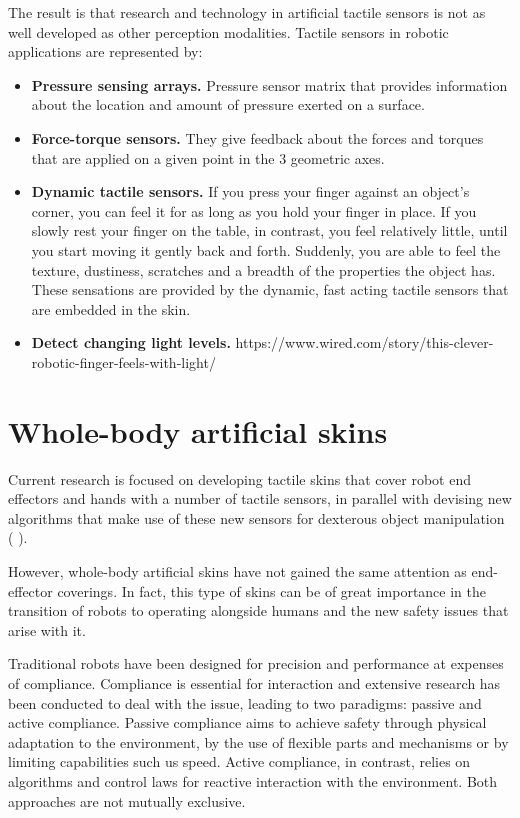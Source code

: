 The result is that research and technology in artificial tactile sensors is not as well developed as other perception modalities. Tactile sensors in robotic applications are represented by:

\begin{itemize}
    \item\textbf{Pressure sensing arrays.} Pressure sensor matrix that provides information about the location and amount of pressure exerted on a surface.
    \item\textbf{Force-torque sensors.} They give feedback about the forces and torques that are applied on a given point in the 3 geometric axes.
\item\textbf{Dynamic tactile sensors.} If you press your finger against an object’s corner, you can feel it for as long as you hold your finger in place. If you slowly rest your finger on the table, in contrast, you feel relatively little, until you start moving it gently back and forth. Suddenly, you are able to feel the texture, dustiness, scratches and a breadth of the properties the object has. These sensations are provided by the dynamic, fast acting tactile sensors that are embedded in the skin.
    \item\textbf{Detect changing light levels.}  https://www.wired.com/story/this-clever-robotic-finger-feels-with-light/
\end{itemize}

\section{Whole-body artificial skins}
Current research is focused on developing tactile skins that cover robot end effectors and hands with a number of tactile sensors, in parallel with devising new algorithms that make use of these new sensors for dexterous object manipulation (\cite{tianFeel} \cite{wilson2020design}).

However, whole-body artificial skins have not gained the same attention as end-effector coverings. In fact, this type of skins can be of great importance in the transition of robots to operating alongside humans and the new safety issues that arise with it.

Traditional robots have been designed for precision and performance at expenses of compliance. Compliance is essential for interaction and extensive research has been conducted to deal with the issue, leading to two paradigms: passive and active compliance.  Passive compliance aims to achieve safety through physical adaptation to the environment, by the use of flexible parts and mechanisms or by limiting capabilities such us speed. Active compliance, in contrast, relies on algorithms and control laws for reactive interaction with the environment. Both approaches are not mutually exclusive.

